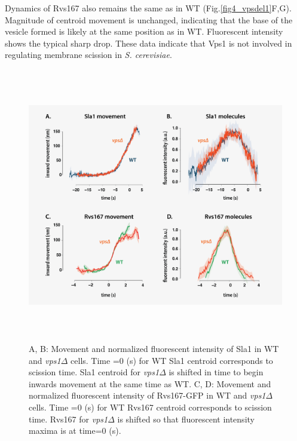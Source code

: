 \vspace{5mm}
Dynamics of Rvs167 also remains the same as in WT (Fig.\ref{fig4_vpsdel1}F,G). Magnitude of centroid movement is unchanged, indicating that the base of the vesicle formed is likely at the same position as in WT. Fluorescent intensity shows the typical sharp drop. These data indicate that Vps1 is not involved in regulating membrane scission in \textit{S. cerevisiae}.  


	\begin{figure}[H]
	\centering
	\includegraphics[width=12cm,height=12cm,keepaspectratio]{figures/results_final/vps2}
	\caption[Tracking endocytic proteins in \textit{vps1$\Delta$} cells]
	{A, B: Movement and normalized fluorescent intensity of Sla1 in WT and \textit{vps1$\Delta$} cells. Time =0 (s) for WT Sla1 centroid corresponds to scission time. Sla1 centroid for \textit{vps1$\Delta$} is shifted in time to begin inwards movement at the same time as WT. 
		C, D: Movement and normalized fluorescent intensity of Rvs167-GFP in WT and  \textit{vps1$\Delta$} cells. Time =0 (s) for WT Rvs167 centroid corresponds to scission time. Rvs167 for \textit{vps1$\Delta$} is shifted so that fluorescent intensity maxima is at time=0 (s).
		\label{fig4_vpsdel2}}
\end{figure}



\newpage
